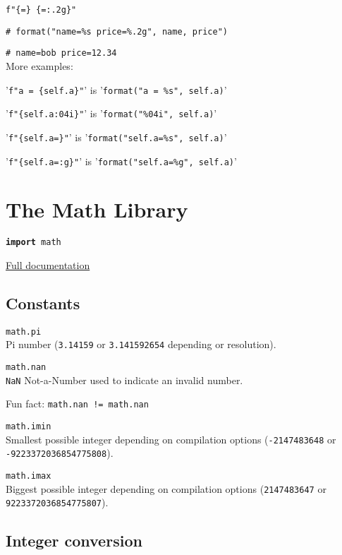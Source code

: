 \texttt{f"\{}\texttt{=\} \{}\texttt{=:.2g\}"}

\texttt{\# format("name=\%s price=\%.2g", name, price")}

\texttt{\# name=bob price=12.34}\\

\hangpar More examples:

'\texttt{f"a = \{self.a\}"}' is  '\texttt{format("a = \%s", self.a)}'

'\texttt{f"\{self.a:04i\}"}' is  '\texttt{format("\%04i", self.a)}'

'\texttt{f"\{self.a=\}"}' is  '\texttt{format("self.a=\%s", self.a)}'

'\texttt{f"\{self.a=:g\}"}' is  '\texttt{format("self.a=\%g", self.a)}'

\section*{The Math Library}

\hangpar \texttt{\textbf{import} math}

\hangpar \href{https://github.com/berry-lang/berry/wiki/Chapter-7\#math-module}{Full documentation}

\subsection*{Constants}

\hangpar \texttt{math.pi}\\
Pi number (\texttt{3.14159} or \texttt{3.141592654} depending or resolution).

\hangpar \texttt{math.nan}\\
\texttt{NaN} Not-a-Number used to indicate an invalid number.

Fun fact: \texttt{math.nan != math.nan}

\hangpar \texttt{math.imin}\\
Smallest possible integer depending on compilation options (\texttt{-2147483648} or \texttt{-9223372036854775808}).

\hangpar \texttt{math.imax}\\
Biggest possible integer depending on compilation options (\texttt{2147483647} or \texttt{9223372036854775807}).

\subsection*{Integer conversion}

